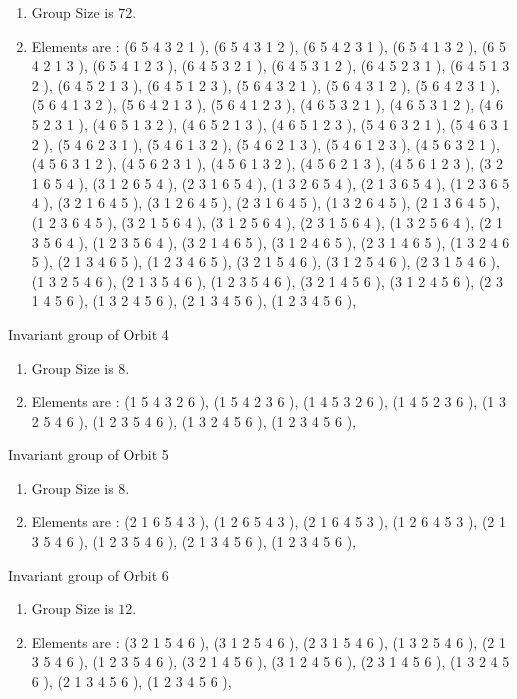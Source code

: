 \documentclass[12pt]{article}
\begin{document}
\begin{enumerate}
\item Group Size is $72$.
\item Elements are : (6 5 4 3 2 1  ), (6 5 4 3 1 2  ), (6 5 4 2 3 1  ), (6 5 4 1 3 2  ), (6 5 4 2 1 3  ), (6 5 4 1 2 3  ), (6 4 5 3 2 1  ), (6 4 5 3 1 2  ), (6 4 5 2 3 1  ), (6 4 5 1 3 2  ), (6 4 5 2 1 3  ), (6 4 5 1 2 3  ), (5 6 4 3 2 1  ), (5 6 4 3 1 2  ), (5 6 4 2 3 1  ), (5 6 4 1 3 2  ), (5 6 4 2 1 3  ), (5 6 4 1 2 3  ), (4 6 5 3 2 1  ), (4 6 5 3 1 2  ), (4 6 5 2 3 1  ), (4 6 5 1 3 2  ), (4 6 5 2 1 3  ), (4 6 5 1 2 3  ), (5 4 6 3 2 1  ), (5 4 6 3 1 2  ), (5 4 6 2 3 1  ), (5 4 6 1 3 2  ), (5 4 6 2 1 3  ), (5 4 6 1 2 3  ), (4 5 6 3 2 1  ), (4 5 6 3 1 2  ), (4 5 6 2 3 1  ), (4 5 6 1 3 2  ), (4 5 6 2 1 3  ), (4 5 6 1 2 3  ), (3 2 1 6 5 4  ), (3 1 2 6 5 4  ), (2 3 1 6 5 4  ), (1 3 2 6 5 4  ), (2 1 3 6 5 4  ), (1 2 3 6 5 4  ), (3 2 1 6 4 5  ), (3 1 2 6 4 5  ), (2 3 1 6 4 5  ), (1 3 2 6 4 5  ), (2 1 3 6 4 5  ), (1 2 3 6 4 5  ), (3 2 1 5 6 4  ), (3 1 2 5 6 4  ), (2 3 1 5 6 4  ), (1 3 2 5 6 4  ), (2 1 3 5 6 4  ), (1 2 3 5 6 4  ), (3 2 1 4 6 5  ), (3 1 2 4 6 5  ), (2 3 1 4 6 5  ), (1 3 2 4 6 5  ), (2 1 3 4 6 5  ), (1 2 3 4 6 5  ), (3 2 1 5 4 6  ), (3 1 2 5 4 6  ), (2 3 1 5 4 6  ), (1 3 2 5 4 6  ), (2 1 3 5 4 6  ), (1 2 3 5 4 6  ), (3 2 1 4 5 6  ), (3 1 2 4 5 6  ), (2 3 1 4 5 6  ), (1 3 2 4 5 6  ), (2 1 3 4 5 6  ), (1 2 3 4 5 6  ), 
\end{enumerate}
Invariant group of Orbit 4
\begin{enumerate}
\item Group Size is $8$.
\item Elements are : (1 5 4 3 2 6  ), (1 5 4 2 3 6  ), (1 4 5 3 2 6  ), (1 4 5 2 3 6  ), (1 3 2 5 4 6  ), (1 2 3 5 4 6  ), (1 3 2 4 5 6  ), (1 2 3 4 5 6  ), 
\end{enumerate}
Invariant group of Orbit 5
\begin{enumerate}
\item Group Size is $8$.
\item Elements are : (2 1 6 5 4 3  ), (1 2 6 5 4 3  ), (2 1 6 4 5 3  ), (1 2 6 4 5 3  ), (2 1 3 5 4 6  ), (1 2 3 5 4 6  ), (2 1 3 4 5 6  ), (1 2 3 4 5 6  ), 
\end{enumerate}
Invariant group of Orbit 6
\begin{enumerate}
\item Group Size is $12$.
\item Elements are : (3 2 1 5 4 6  ), (3 1 2 5 4 6  ), (2 3 1 5 4 6  ), (1 3 2 5 4 6  ), (2 1 3 5 4 6  ), (1 2 3 5 4 6  ), (3 2 1 4 5 6  ), (3 1 2 4 5 6  ), (2 3 1 4 5 6  ), (1 3 2 4 5 6  ), (2 1 3 4 5 6  ), (1 2 3 4 5 6  ), 
\end{enumerate}
\end{document}
